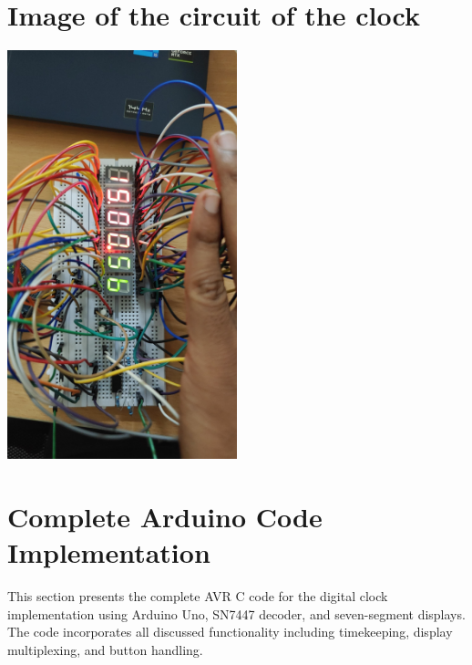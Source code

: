 \documentclass{article}
\begin{document}
\section{Image of the circuit of the clock}
\begin{center}
    \includegraphics[width=0.5\textwidth]{Figs/clock.jpg} %
\end{center}

\section{Complete Arduino Code Implementation}
\label{sec:complete_code}

This section presents the complete AVR C code for the digital clock implementation using Arduino Uno, SN7447 decoder, and seven-segment displays. The code incorporates all discussed functionality including timekeeping, display multiplexing, and button handling.
\end{document}
